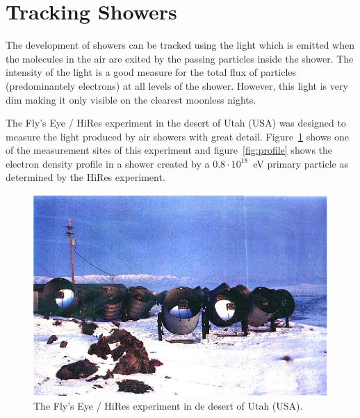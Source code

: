 \documentclass[12pt,a4paper]{article}
\numberwithin{equation}{section}
\numberwithin{figure}{section}
\numberwithin{table}{section}
\begin{document}
\section{Tracking Showers}
The development of showers can be tracked using the light which is emitted when the molecules in the air are exited by the passing particles inside the shower. The intensity of the light is a good measure for the total flux of particles (predominantely electrons) at all levels of the shower. However, this light is very dim making it only visible on the clearest moonless nights.

The Fly's Eye / HiRes experiment in the desert of Utah (USA) was designed to measure the light produced by air showers with great detail. Figure~\ref{fig:HiRES} shows one of the measurement sites of this experiment and figure~\ref{fig:profile} shows the electron density profile in a shower created by a $0.8 \cdot 10^{18}$~eV primary particle as determined by the HiRes experiment.

\begin{figure}\begin{center}
\includegraphics[scale=1]{HiRES.eps}%
\caption{The Fly's Eye / HiRes experiment in de desert of Utah (USA).}\label{fig:HiRES}
\end{center}\end{figure}
\end{document}
